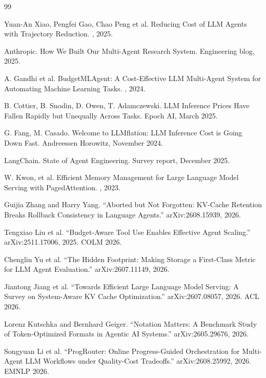\begin{thebibliography}{99}

Yuan-An Xiao, Pengfei Gao, Chao Peng et al.
\newblock Reducing Cost of LLM Agents with Trajectory Reduction.
, 2025.

Anthropic.
\newblock How We Built Our Multi-Agent Research System.
\newblock Engineering blog, 2025.

A. Gandhi et al.
\newblock BudgetMLAgent: A Cost-Effective LLM Multi-Agent System for Automating Machine Learning Tasks.
, 2024.

B. Cottier, B. Snodin, D. Owen, T. Adamczewski.
\newblock LLM Inference Prices Have Fallen Rapidly but Unequally Across Tasks.
\newblock Epoch AI, March 2025.

G. Fang, M. Casado.
\newblock Welcome to LLMflation: LLM Inference Cost is Going Down Fast.
\newblock Andreessen Horowitz, November 2024.

LangChain.
\newblock State of Agent Engineering.
\newblock Survey report, December 2025.

W. Kwon, et al.
\newblock Efficient Memory Management for Large Language Model Serving with PagedAttention.
, 2023.


Guijia Zhang and Harry Yang.
``Aborted but Not Forgotten: KV-Cache Retention Breaks Rollback Consistency in Language Agents.''
arXiv:2608.15939, 2026.

Tengxiao Liu et al.
``Budget-Aware Tool Use Enables Effective Agent Scaling.''
arXiv:2511.17006, 2025. COLM 2026.

Chenglin Yu et al.
``The Hidden Footprint: Making Storage a First-Class Metric for LLM Agent Evaluation.''
arXiv:2607.11149, 2026.

Jiantong Jiang et al.
``Towards Efficient Large Language Model Serving: A Survey on System-Aware KV Cache Optimization.''
arXiv:2607.08057, 2026. ACL 2026.

Lorenz Kutschka and Bernhard Geiger.
``Notation Matters: A Benchmark Study of Token-Optimized Formats in Agentic AI Systems.''
arXiv:2605.29676, 2026.

Songyuan Li et al.
``ProgRouter: Online Progress-Guided Orchestration for Multi-Agent LLM Workflows under Quality-Cost Tradeoffs.''
arXiv:2608.25992, 2026. EMNLP 2026.


\end{thebibliography}
